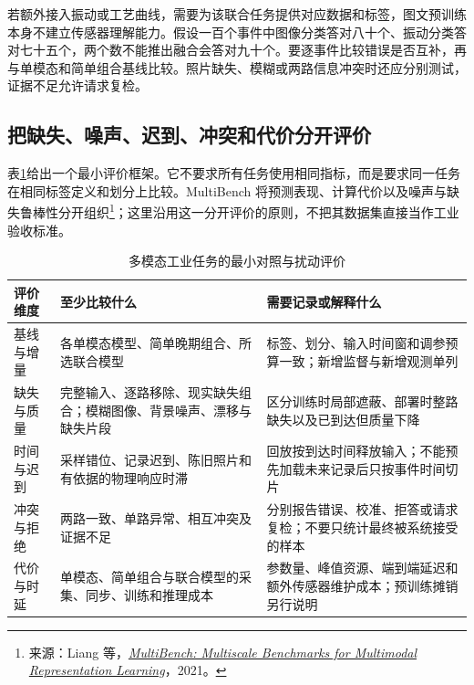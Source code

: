 若额外接入振动或工艺曲线，需要为该联合任务提供对应数据和标签，图文预训练本身不建立传感器理解能力。假设一百个事件中图像分类答对八十个、振动分类答对七十五个，两个数不能推出融合会答对九十个。要逐事件比较错误是否互补，再与单模态和简单组合基线比较。照片缺失、模糊或两路信息冲突时还应分别测试，证据不足允许请求复检。

\subsection{把缺失、噪声、迟到、冲突和代价分开评价}
表\ref{tab:multimodal-evaluation-protocol}给出一个最小评价框架。它不要求所有任务使用相同指标，而是要求同一任务在相同标签定义和划分上比较。MultiBench 将预测表现、计算代价以及噪声与缺失鲁棒性分开组织\footnote{来源：Liang 等，\href{https://datasets-benchmarks-proceedings.neurips.cc/paper/2021/hash/37693cfc748049e45d87b8c7d8b9aacd-Abstract-round1.html}{\textit{MultiBench: Multiscale Benchmarks for Multimodal Representation Learning}}，2021。}；这里沿用这一分开评价的原则，不把其数据集直接当作工业验收标准。

\begin{table}[H]
\centering
\caption{多模态工业任务的最小对照与扰动评价}
\label{tab:multimodal-evaluation-protocol}
\small
\setlength{\tabcolsep}{3pt}
\begin{tabular}{@{}>{\raggedright\arraybackslash}m{2.4cm}>{\raggedright\arraybackslash}m{4.6cm}>{\raggedright\arraybackslash}m{4.9cm}@{}}
\toprule
评价维度 & 至少比较什么 & 需要记录或解释什么 \\
\midrule
基线与增量 & 各单模态模型、简单晚期组合、所选联合模型 & 标签、划分、输入时间窗和调参预算一致；新增监督与新增观测单列 \\
缺失与质量 & 完整输入、逐路移除、现实缺失组合；模糊图像、背景噪声、漂移与缺失片段 & 区分训练时局部遮蔽、部署时整路缺失以及已到达但质量下降 \\
时间与迟到 & 采样错位、记录迟到、陈旧照片和有依据的物理响应时滞 & 回放按到达时间释放输入；不能预先加载未来记录后只按事件时间切片 \\
冲突与拒绝 & 两路一致、单路异常、相互冲突及证据不足 & 分别报告错误、校准、拒答或请求复检；不要只统计最终被系统接受的样本 \\
代价与时延 & 单模态、简单组合与联合模型的采集、同步、训练和推理成本 & 参数量、峰值资源、端到端延迟和额外传感器维护成本；预训练摊销另行说明 \\
\bottomrule
\end{tabular}
\end{table}

